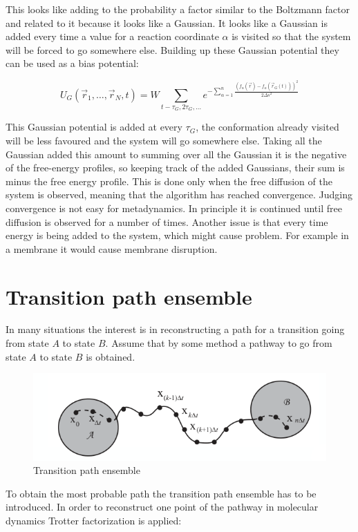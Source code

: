 This looks like adding to the probability a factor similar to the Boltzmann factor and related to it because it looks like a Gaussian.
It looks like a Gaussian is added every time a value for a reaction coordinate $\alpha$ is visited so that the system will be forced to go somewhere else.
Building up these Gaussian potential they can be used as a bias potential:

$$U_G(\vec{r}_1, \dots, \vec{r}_N, t) = W\sum\limits_{t - \tau_G, 2\tau_G, \dots}e^{-\sum\limits_{\alpha=1}^n\frac{(f_\alpha(\vec{r})-f_\alpha(\vec{r}_G(t)))^2}{2\Delta s^2}}$$

This Gaussian potential is added at every $\tau_G$, the conformation already visited will be less favoured and the system will go somewhere else.
Taking all the Gaussian added this amount to summing over all the Gaussian it is the negative of the free-energy profiles, so keeping track of the added Gaussians, their sum is minus the free energy profile.
This is done only when the free diffusion of the system is observed, meaning that the algorithm has reached convergence.
Judging convergence is not easy for metadynamics.
In principle it is continued until free diffusion is observed for a number of times.
Another issue is that every time energy is being added to the system, which might cause problem.
For example in a membrane it would cause membrane disruption.

\section{Transition path ensemble}
In many situations the interest is in reconstructing a path for a transition going from state $A$ to state $B$.
Assume that by some method a pathway to go from state $A$ to state $B$ is obtained.

\begin{figure}[H]
	\includegraphics[width=\textwidth]{transition-path-ensemble}
	\caption{Transition path ensemble}
	\label{fig:transition-path-ensemble}
\end{figure}

To obtain the most probable path the transition path ensemble has to be introduced.
In order to reconstruct one point of the pathway in molecular dynamics Trotter factorization is applied:

